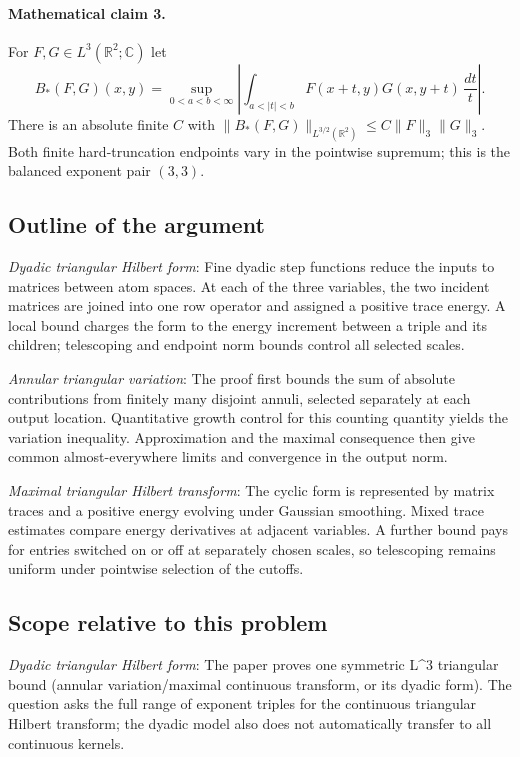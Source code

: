 \documentclass[11pt]{article}
\begin{document}
\paragraph{Mathematical claim 3.} For $F,G\in L^3(\mathbb R^2;\mathbb C)$ let \[B_*(F,G)(x,y)=\sup_{0<a<b<\infty}\left|\int_{a<|t|<b}F(x+t,y)G(x,y+t)\,\frac{dt}{t}\right|.\] There is an absolute finite $C$ with $\|B_*(F,G)\|_{L^{3/2}(\mathbb R^2)}\le C\|F\|_3\|G\|_3$. Both finite hard-truncation endpoints vary in the pointwise supremum; this is the balanced exponent pair $(3,3)$.

\subsection{Outline of the argument}
\textit{Dyadic triangular Hilbert form}: Fine dyadic step functions reduce the inputs to matrices between atom spaces. At each of the three variables, the two incident matrices are joined into one row operator and assigned a positive trace energy. A local bound charges the form to the energy increment between a triple and its children; telescoping and endpoint norm bounds control all selected scales.

\textit{Annular triangular variation}: The proof first bounds the sum of absolute contributions from finitely many disjoint annuli, selected separately at each output location. Quantitative growth control for this counting quantity yields the variation inequality. Approximation and the maximal consequence then give common almost-everywhere limits and convergence in the output norm.

\textit{Maximal triangular Hilbert transform}: The cyclic form is represented by matrix traces and a positive energy evolving under Gaussian smoothing. Mixed trace estimates compare energy derivatives at adjacent variables. A further bound pays for entries switched on or off at separately chosen scales, so telescoping remains uniform under pointwise selection of the cutoffs.

\subsection{Scope relative to this problem}
\textit{Dyadic triangular Hilbert form}: The paper proves one symmetric L\textasciicircum{}3 triangular bound (annular variation/maximal continuous transform, or its dyadic form). The question asks the full range of exponent triples for the continuous triangular Hilbert transform; the dyadic model also does not automatically transfer to all continuous kernels.
\end{document}
